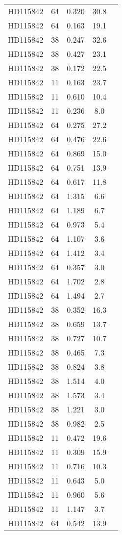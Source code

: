 \begin{table*}
\begin{tabular}{l c c c c}
HD115842 & 64 & 0.320 & 30.8\\ 
HD115842 & 64 & 0.163 & 19.1\\ 
HD115842 & 38 & 0.247 & 32.6\\ 
HD115842 & 38 & 0.427 & 23.1\\ 
HD115842 & 38 & 0.172 & 22.5\\ 
HD115842 & 11 & 0.163 & 23.7\\ 
HD115842 & 11 & 0.610 & 10.4\\ 
HD115842 & 11 & 0.236 & 8.0\\ 
HD115842 & 64 & 0.275 & 27.2\\ 
HD115842 & 64 & 0.476 & 22.6\\ 
HD115842 & 64 & 0.869 & 15.0\\ 
HD115842 & 64 & 0.751 & 13.9\\ 
HD115842 & 64 & 0.617 & 11.8\\ 
HD115842 & 64 & 1.315 & 6.6\\ 
HD115842 & 64 & 1.189 & 6.7\\ 
HD115842 & 64 & 0.973 & 5.4\\ 
HD115842 & 64 & 1.107 & 3.6\\ 
HD115842 & 64 & 1.412 & 3.4\\ 
HD115842 & 64 & 0.357 & 3.0\\ 
HD115842 & 64 & 1.702 & 2.8\\ 
HD115842 & 64 & 1.494 & 2.7\\ 
HD115842 & 38 & 0.352 & 16.3\\ 
HD115842 & 38 & 0.659 & 13.7\\ 
HD115842 & 38 & 0.727 & 10.7\\ 
HD115842 & 38 & 0.465 & 7.3\\ 
HD115842 & 38 & 0.824 & 3.8\\ 
HD115842 & 38 & 1.514 & 4.0\\ 
HD115842 & 38 & 1.573 & 3.4\\ 
HD115842 & 38 & 1.221 & 3.0\\ 
HD115842 & 38 & 0.982 & 2.5\\ 
HD115842 & 11 & 0.472 & 19.6\\ 
HD115842 & 11 & 0.309 & 15.9\\ 
HD115842 & 11 & 0.716 & 10.3\\ 
HD115842 & 11 & 0.643 & 5.0\\ 
HD115842 & 11 & 0.960 & 5.6\\ 
HD115842 & 11 & 1.147 & 3.7\\ 
HD115842 & 64 & 0.542 & 13.9\\ 

\end{tabular}
\end{table*}
